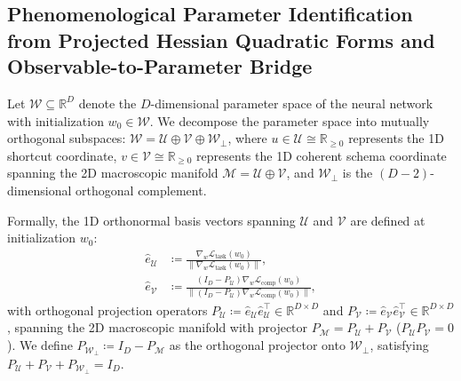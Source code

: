 \documentclass{article}
\theoremstyle{plain}
\theoremstyle{definition}
\begin{document}
\subsection{Phenomenological Parameter Identification from Projected Hessian Quadratic Forms and Observable-to-Parameter Bridge}
\label{sec:app_hessian_derivation}
Let $\mathcal{W} \subseteq \mathbb{R}^D$ denote the $D$-dimensional parameter space of the neural network with initialization $w_0 \in \mathcal{W}$. We decompose the parameter space into mutually orthogonal subspaces: $\mathcal{W} = \mathcal{U} \oplus \mathcal{V} \oplus \mathcal{W}_\perp$, where $u \in \mathcal{U} \cong \mathbb{R}_{\ge 0}$ represents the 1D shortcut coordinate, $v \in \mathcal{V} \cong \mathbb{R}_{\ge 0}$ represents the 1D coherent schema coordinate spanning the 2D macroscopic manifold $\mathcal{M} = \mathcal{U} \oplus \mathcal{V}$, and $\mathcal{W}_\perp$ is the $(D-2)$-dimensional orthogonal complement.

Formally, the 1D orthonormal basis vectors spanning $\mathcal{U}$ and $\mathcal{V}$ are defined at initialization $w_0$:
\begin{align}
    \hat{e}_{\mathcal{U}} &\coloneqq \frac{\nabla_w \mathcal{L}_{\text{task}}(w_0)}{\|\nabla_w \mathcal{L}_{\text{task}}(w_0)\|}, \label{eq:app_e_u_def} \\
    \hat{e}_{\mathcal{V}} &\coloneqq \frac{(I_D - P_{\mathcal{U}}) \nabla_w \mathcal{L}_{\text{comp}}(w_0)}{\|(I_D - P_{\mathcal{U}}) \nabla_w \mathcal{L}_{\text{comp}}(w_0)\|}, \label{eq:app_e_v_def}
\end{align}
with orthogonal projection operators $P_{\mathcal{U}} \coloneqq \hat{e}_{\mathcal{U}} \hat{e}_{\mathcal{U}}^\top \in \mathbb{R}^{D \times D}$ and $P_{\mathcal{V}} \coloneqq \hat{e}_{\mathcal{V}} \hat{e}_{\mathcal{V}}^\top \in \mathbb{R}^{D \times D}$, spanning the 2D macroscopic manifold with projector $P_{\mathcal{M}} = P_{\mathcal{U}} + P_{\mathcal{V}}$ ($P_{\mathcal{U}} P_{\mathcal{V}} = 0$). We define $P_{\mathcal{W}_\perp} \coloneqq I_D - P_{\mathcal{M}}$ as the orthogonal projector onto $\mathcal{W}_\perp$, satisfying $P_{\mathcal{U}} + P_{\mathcal{V}} + P_{\mathcal{W}_\perp} = I_D$.
\end{document}
